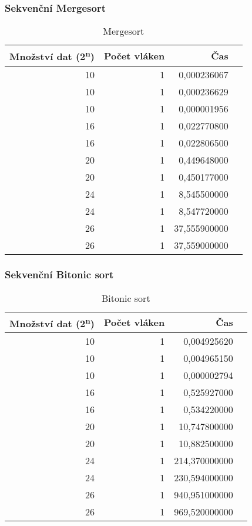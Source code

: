 \documentclass[12pt]{article}
\begin{document}
\subsubsection{Sekvenční Mergesort}
\begin{table}[H]
\begin{center}
\begin{tabular}{|r|r|r|r|}
\hline Množství dat (2\textsuperscript{n}) & Počet vláken & Čas \\ \hline
10 & 1 &  0,000236067 \\ \hline
10 & 1 &  0,000236629 \\ \hline
10 & 1 &  0,000001956 \\ \hline
16 & 1 &  0,022770800 \\ \hline
16 & 1 &  0,022806500 \\ \hline
20 & 1 &  0,449648000 \\ \hline
20 & 1 &  0,450177000 \\ \hline
24 & 1 &  8,545500000 \\ \hline
24 & 1 &  8,547720000 \\ \hline
26 & 1 &  37,555900000 \\ \hline
26 & 1 &  37,559000000 \\ \hline
\end{tabular} 
\end{center}
\caption{Mergesort}
\end{table}


\subsubsection{Sekvenční Bitonic sort}
\begin{table}[H]
\begin{center}
\begin{tabular}{|r|r|r|r|}
\hline Množství dat (2\textsuperscript{n}) & Počet vláken & Čas \\ \hline
10  & 1 & 0,004925620 \\ \hline
10  & 1 & 0,004965150 \\ \hline
10  & 1 & 0,000002794 \\ \hline
16  & 1 & 0,525927000 \\ \hline
16  & 1 & 0,534220000 \\ \hline
20  & 1 & 10,747800000 \\ \hline
20  & 1 & 10,882500000 \\ \hline
24  & 1 & 214,370000000 \\ \hline
24  & 1 & 230,594000000 \\ \hline
26  & 1 & 940,951000000 \\ \hline
26  & 1 & 969,520000000 \\ \hline
\end{tabular} 
\end{center}
\caption{Bitonic sort}
\end{table}
\end{document}
